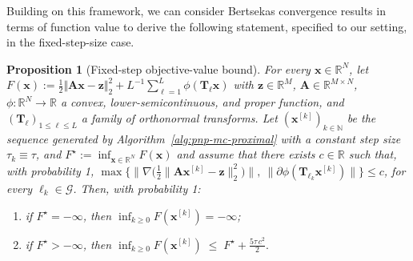 \documentclass{article}
\newtheorem{proposition}{Proposition}
\newcommand{\prox}{\operatorname{prox}}
\newcommand{\xb}{\mathbf{x}}
\newcommand{\Ab}{\mathbf{A}}
\newcommand{\zb}{\mathbf{z}}
\newcommand{\ub}{\mathbf{u}}
\begin{document}
Building on this framework, we can consider Bertsekas convergence results in terms of function value to derive the following statement, specified to our setting, in the fixed-step-size case.
\begin{proposition}[Fixed-step objective-value bound]
\label{prop:convergence-pas-fixe}
For every $\xb\in \mathbb{R}^N$, let $F(\xb) :=\frac{1}{2}\Vert \Ab \xb - \zb \Vert_2^2 + L^{-1}\sum_{\ell=1}^L\phi(\mathbf{T}_\ell \xb)$ with $\zb\in \mathbb{R}^M$, $\Ab\in \mathbb{R}^{M\times N}$, $\phi\colon \mathbb{R}^N \to \mathbb{R}$ a convex, lower-semicontinuous, and proper function, and $(\mathbf{T}_\ell)_{1\leq \ell \leq L}$ a family of orthonormal transforms.  Let $(\xb^{[k]})_{k\in \mathbb{N}}$ be the sequence generated by
Algorithm~\eqref{alg:pnp-mc-proximal} with a constant step size
$\tau_k \equiv \tau$, and $F^\star := \inf_{\xb\in \mathbb{R}^N} F(\xb)$ and assume that there exists $c\in\mathbb{R}$ such that, with probability 1,  
$
\max\Big\{\big\|\nabla\big(\tfrac{1}{2}\|\Ab \xb^{[k]}-\zb\|_2^2\big)\big\|,\ \|\partial \phi(\mathbf{T}_{\ell_k} \xb^{[k]})\|\Big\} \le c$, for every $\ell_k \in \mathcal{G}$.
Then, with probability 1:\vspace{-0.3cm}
\begin{enumerate}
  \item[(i)] if $F^\star = -\infty$, then $\inf_{k\ge0} F(\xb^{[k]}) = -\infty$;\vspace{-0.3cm}
  \item[(ii)] if $F^\star > -\infty$, then 
$    \inf_{k\ge 0} F(\xb^{[k]}) \;\le\; F^\star + \frac{5\tau\,c^2}{2}.$
\end{enumerate}
\end{proposition}
\end{document}
